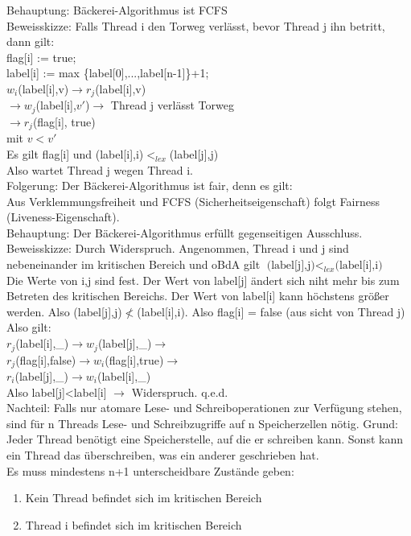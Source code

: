 \documentclass[a4paper,12pt]{scrartcl}
\begin{document}
Behauptung: Bäckerei-Algorithmus ist FCFS\\
Beweisskizze: Falls Thread i den Torweg verlässt, bevor Thread j ihn betritt, dann gilt:\\
 flag[i] := true;\\
 label[i] := max \{label[0],...,label[n-1]\}+1;\\
 $w_i$(label[i],v)$\to r_j$(label[i],v)\\
 $\to w_j$(label[i],$v'$)$\to$ Thread j verlässt Torweg\\
 $\to r_j$(flag[i], true)\\
 mit $v<v'$\\
 Es gilt flag[i] und (label[i],i)$<_{lex}$(label[j],j)\\
 Also wartet Thread j wegen Thread i.\\
 Folgerung: Der Bäckerei-Algorithmus ist fair, denn es gilt:\\
 Aus Verklemmungsfreiheit und FCFS (Sicherheitseigenschaft) folgt Fairness (Liveness-Eigenschaft).\\
 Behauptung: Der Bäckerei-Algorithmus erfüllt gegenseitigen Ausschluss.\\
 Beweisskizze: Durch Widerspruch. Angenommen, Thread i und j sind nebeneinander im kritischen Bereich und oBdA gilt $\text{(label[j],j)}<_{lex}\text{(label[i],i)}$\\
 Die Werte von i,j sind fest. Der Wert von label[j] ändert sich niht mehr bis zum Betreten des kritischen Bereichs. Der Wert von label[i] kann höchstens größer werden. Also (label[j],j)$\not<$(label[i],i). Also flag[i] = false (aus sicht von Thread j)\\
 Also gilt:\\ 
 $r_j$(label[i],\_)$\to w_j$(label[j],\_)$\to$\\
  $r_j$(flag[i],false)$\to w_i$(flag[i],true)$\to$\\
   $r_i$(label[j],\_)$\to w_i$(label[i],\_)\\
 
 Also  label[j]<label[i] $\to$ Widerspruch. q.e.d.\\
 Nachteil: Falls nur atomare Lese- und Schreiboperationen zur Verfügung stehen, sind für n Threads Lese- und Schreibzugriffe auf n Speicherzellen nötig. Grund: Jeder Thread benötigt eine Speicherstelle, auf die er schreiben kann. Sonst kann ein Thread das überschreiben, was ein anderer geschrieben hat.\\
 Es muss mindestens n+1 unterscheidbare Zustände geben:
 \begin{enumerate}
  \item Kein Thread befindet sich im kritischen Bereich
  \item Thread i befindet sich im kritischen Bereich
 \end{enumerate}
\end{document}

